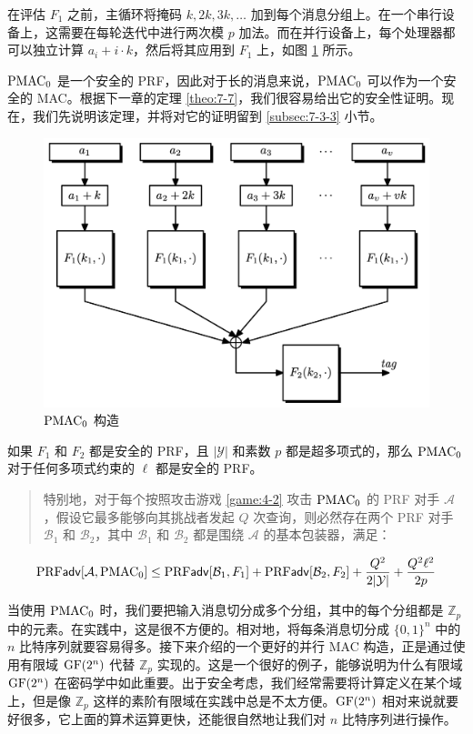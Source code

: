 \vspace{5pt}

\noindent
在评估 $F_1$ 之前，主循环将掩码 $k,2k,3k,\dots$ 加到每个消息分组上。在一个串行设备上，这需要在每轮迭代中进行两次模 $p$ 加法。而在并行设备上，每个处理器都可以独立计算 $a_i+i\cdot k$，然后将其应用到 $F_1$ 上，如图 \ref{fig:6-9} 所示。

$\rm PMAC_0$ 是一个安全的 PRF，因此对于长的消息来说，$\rm PMAC_0$ 可以作为一个安全的 MAC。根据下一章的定理 \ref{theo:7-7}，我们很容易给出它的安全性证明。现在，我们先说明该定理，并将对它的证明留到 \ref{subsec:7-3-3} 小节。

\begin{figure}
  \centering
  \includegraphics[width=0.6\linewidth]{figures/chapter6/fig9.png}
  \caption{$\rm PMAC_0$ 构造}
  \label{fig:6-9}
\end{figure}

\begin{theorem}\label{theo:6-11}
如果 $F_1$ 和 $F_2$ 都是安全的 PRF，且 $|\mathcal{Y}|$ 和素数 $p$ 都是超多项式的，那么 $\rm PMAC_0$ 对于任何多项式约束的 $\ell$ 都是安全的 PRF。
\begin{quote}
特别地，对于每个按照攻击游戏 \ref{game:4-2} 攻击 $\rm PMAC_0$ 的 PRF 对手 $\mathcal{A}$，假设它最多能够向其挑战者发起 $Q$ 次查询，则必然存在两个 PRF 对手 $\mathcal{B}_1$ 和 $\mathcal{B}_2$，其中 $\mathcal{B}_1$ 和 $\mathcal{B}_2$ 都是围绕 $\mathcal{A}$ 的基本包装器，满足：
\end{quote}
\begin{equation}\label{eq:6-28}
{\rm PRF}\mathsf{adv}[\mathcal{A}, {\rm PMAC_0}]\leq{\rm PRF}\mathsf{adv}[\mathcal{B}_1,F_1]+{\rm PRF}\mathsf{adv}[\mathcal{B}_2,F_2]+\frac{Q^2}{2|\mathcal{Y}|}+\frac{Q^2\ell^2}{2p}
\end{equation}
\end{theorem}

当使用 $\rm PMAC_0$ 时，我们要把输入消息切分成多个分组，其中的每个分组都是 $\mathbb{Z}_p$ 中的元素。在实践中，这是很不方便的。相对地，将每条消息切分成 $\{0,1\}^n$ 中的 $n$ 比特序列就要容易得多。接下来介绍的一个更好的并行 MAC 构造，正是通过使用有限域 ${\rm GF}(2^n)$ 代替 $\mathbb{Z}_p$ 实现的。这是一个很好的例子，能够说明为什么有限域 ${\rm GF}(2^n)$ 在密码学中如此重要。出于安全考虑，我们经常需要将计算定义在某个域上，但是像 $\mathbb{Z}_p$ 这样的素阶有限域在实践中总是不太方便。${\rm GF}(2^n)$ 相对来说就要好很多，它上面的算术运算更快，还能很自然地让我们对 $n$ 比特序列进行操作。

